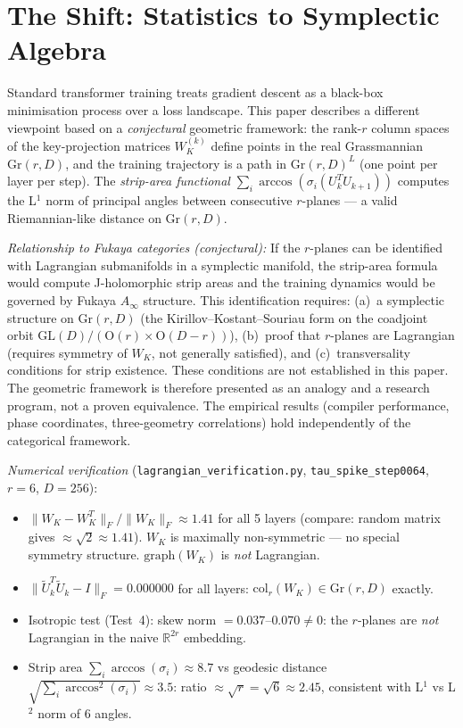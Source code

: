 \documentclass[11pt]{amsart}
\begin{document}
\tableofcontents

\section{The Shift: Statistics to Symplectic Algebra}
\label{sec:shift}

Standard transformer training treats gradient descent as a black-box
minimisation process over a loss landscape.
This paper describes a different viewpoint based on a \emph{conjectural}
geometric framework: the rank-$r$ column spaces of the key-projection
matrices $W_K^{(k)}$ define points in the real Grassmannian $\mathrm{Gr}(r,D)$,
and the training trajectory is a path in $\mathrm{Gr}(r,D)^L$ (one point per layer
per step).
The \emph{strip-area functional}
$\sum_i \arccos(\sigma_i(U_k^T U_{k+1}))$
computes the L$^1$ norm of principal angles between consecutive $r$-planes ---
a valid Riemannian-like distance on $\mathrm{Gr}(r,D)$.

\emph{Relationship to Fukaya categories (conjectural):}
If the $r$-planes can be identified with Lagrangian submanifolds
in a symplectic manifold, the strip-area formula would compute
J-holomorphic strip areas and the training dynamics would be governed
by Fukaya $A_\infty$ structure.
This identification requires: (a)~a symplectic structure on $\mathrm{Gr}(r,D)$
(the Kirillov--Kostant--Souriau form on the coadjoint orbit
$\mathrm{GL}(D)/(\mathrm{O}(r)\times\mathrm{O}(D-r))$),
(b)~proof that $r$-planes are Lagrangian (requires symmetry of $W_K$, not
generally satisfied), and (c)~transversality conditions for strip existence.
These conditions are not established in this paper.
The geometric framework is therefore presented as an analogy and a
research program, not a proven equivalence.
The empirical results (compiler performance, phase coordinates,
three-geometry correlations) hold independently of the categorical framework.

\emph{Numerical verification} (\texttt{lagrangian\_verification.py},
\texttt{tau\_spike\_step0064}, $r=6$, $D=256$):
\begin{itemize}
\item $\|W_K - W_K^T\|_F / \|W_K\|_F \approx 1.41$ for all 5 layers
  (compare: random matrix gives $\approx \sqrt{2} \approx 1.41$).
  $W_K$ is maximally non-symmetric --- no special symmetry structure.
  $\mathrm{graph}(W_K)$ is \emph{not} Lagrangian.
\item $\|\tilde{U}_k^T \tilde{U}_k - I\|_F = 0.000000$ for all layers:
  $\mathrm{col}_r(W_K) \in \mathrm{Gr}(r,D)$ exactly.
\item Isotropic test (Test~4): skew norm $= 0.037$--$0.070 \neq 0$:
  the $r$-planes are \emph{not} Lagrangian in the naive $\mathbb{R}^{2r}$ embedding.
\item Strip area $\sum_i \arccos(\sigma_i) \approx 8.7$ vs geodesic
  distance $\sqrt{\sum_i \arccos^2(\sigma_i)} \approx 3.5$:
  ratio $\approx \sqrt{r} = \sqrt{6} \approx 2.45$, consistent with L$^1$
  vs L$^2$ norm of 6 angles.
\end{itemize}
\end{document}
